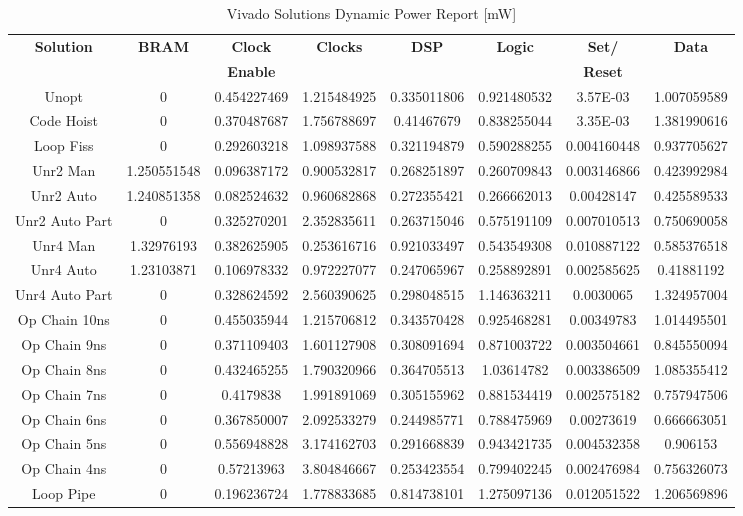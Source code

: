 \begin{table}[H]
	\centering
	\begin{tabular}{|c|c|c|c|c|c|c|c|}
		\hline
		\textbf{Solution} & \textbf{BRAM} & \textbf{Clock} & \textbf{Clocks} & \textbf{DSP} & \textbf{Logic} & \textbf{Set/}& \textbf{Data} \\
		& & \textbf{Enable} & & & & \textbf{Reset} & \\
		\hline
		Unopt & 0 & 0.454227469 & 1.215484925 & 0.335011806 & 0.921480532 & 3.57E-03 & 1.007059589 \\
		Code Hoist & 0 & 0.370487687 & 1.756788697 & 0.41467679 & 0.838255044 & 3.35E-03 & 1.381990616 \\
		Loop Fiss & 0 & 0.292603218 & 1.098937588 & 0.321194879 & 0.590288255 & 0.004160448 & 0.937705627 \\
		Unr2 Man & 1.250551548 & 0.096387172 & 0.900532817 & 0.268251897 & 0.260709843 & 0.003146866 & 0.423992984 \\
		Unr2 Auto & 1.240851358 & 0.082524632 & 0.960682868 & 0.272355421 & 0.266662013 & 0.00428147 & 0.425589533 \\
		Unr2 Auto Part & 0 & 0.325270201 & 2.352835611 & 0.263715046 & 0.575191109 & 0.007010513 & 0.750690058 \\
		Unr4 Man & 1.32976193 & 0.382625905 & 0.253616716 & 0.921033497 & 0.543549308 & 0.010887122 & 0.585376518 \\
		Unr4 Auto & 1.23103871 & 0.106978332 & 0.972227077 & 0.247065967 & 0.258892891 & 0.002585625 & 0.41881192 \\
		Unr4 Auto Part & 0 & 0.328624592 & 2.560390625 & 0.298048515 & 1.146363211 & 0.0030065 & 1.324957004 \\
		Op Chain 10ns & 0 & 0.455035944 & 1.215706812 & 0.343570428 & 0.925468281 & 0.00349783 & 1.014495501 \\
		Op Chain 9ns & 0 & 0.371109403 & 1.601127908 & 0.308091694 & 0.871003722 & 0.003504661 & 0.845550094 \\
		Op Chain 8ns & 0 & 0.432465255 & 1.790320966 & 0.364705513 & 1.03614782 & 0.003386509 & 1.085355412 \\
		Op Chain 7ns & 0 & 0.4179838 & 1.991891069 & 0.305155962 & 0.881534419 & 0.002575182 & 0.757947506 \\
		Op Chain 6ns & 0 & 0.367850007 & 2.092533279 & 0.244985771 & 0.788475969 & 0.00273619 & 0.666663051 \\
		Op Chain 5ns & 0 & 0.556948828 & 3.174162703 & 0.291668839 & 0.943421735 & 0.004532358 & 0.906153 \\
		Op Chain 4ns & 0 & 0.57213963 & 3.804846667 & 0.253423554 & 0.799402245 & 0.002476984 & 0.756326073 \\
		Loop Pipe & 0 & 0.196236724 & 1.778833685 & 0.814738101 & 1.275097136 & 0.012051522 & 1.206569896 \\
		\hline
	\end{tabular}
	\caption{Vivado Solutions Dynamic Power Report [mW]}
	\label{tab:vivado-solutions-dynamic-power-report}
\end{table}



